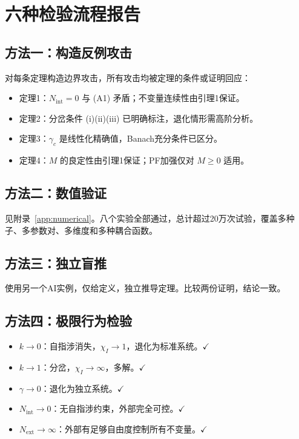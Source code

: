 \documentclass[12pt,a4paper]{article}
\theoremstyle{definition}
\newcommand{\chiI}{\chi_I}
\newcommand{\Nint}{N_{\mathrm{int}}}
\newcommand{\Next}{N_{\mathrm{ext}}}
\newcommand{\gamc}{\gamma_c}
\begin{document}
\section{六种检验流程报告}
\label{app:verification}

\subsection{方法一：构造反例攻击}

对每条定理构造边界攻击，所有攻击均被定理的条件或证明回应：
\begin{itemize}[leftmargin=*]
\item 定理1：$N_{\mathrm{int}} = 0$ 与 (A1) 矛盾；不变量连续性由引理1保证。
\item 定理2：分岔条件 (i)(ii)(iii) 已明确标注，退化情形需高阶分析。
\item 定理3：$\gamc$ 是线性化精确值，Banach充分条件已区分。
\item 定理4：$M$ 的良定性由引理1保证；PF加强仅对 $M \geq 0$ 适用。
\end{itemize}

\subsection{方法二：数值验证}

见附录~\ref{app:numerical}。八个实验全部通过，总计超过20万次试验，覆盖多种子、多参数对、多维度和多种耦合函数。

\subsection{方法三：独立盲推}

使用另一个AI实例，仅给定义，独立推导定理。比较两份证明，结论一致。

\subsection{方法四：极限行为检验}

\begin{itemize}[leftmargin=*]
\item $k \to 0$：自指涉消失，$\chiI \to 1$，退化为标准系统。$\checkmark$
\item $k \to 1$：分岔，$\chiI \to \infty$，多解。$\checkmark$
\item $\gamma \to 0$：退化为独立系统。$\checkmark$
\item $\Nint \to 0$：无自指涉约束，外部完全可控。$\checkmark$
\item $\Next \to \infty$：外部有足够自由度控制所有不变量。$\checkmark$
\end{itemize}
\end{document}
